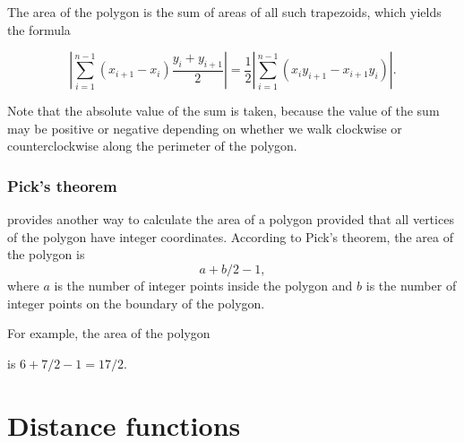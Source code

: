 The area of the polygon is the sum of areas of
all such trapezoids, which yields the formula

\[|\sum_{i=1}^{n-1} (x_{i+1}-x_{i}) \frac{y_i+y_{i+1}}{2}| =
\frac{1}{2} |\sum_{i=1}^{n-1} (x_i y_{i+1} - x_{i+1} y_i)|.\]

Note that the absolute value of the sum is taken,
because the value of the sum may be positive or negative
depending on whether we walk clockwise or counterclockwise
along the perimeter of the polygon.

\subsubsection{Pick's theorem}


 provides another way to calculate
the area of a polygon provided that all vertices 
of the polygon have integer coordinates.
According to Pick's theorem, the area of the polygon is
\[ a + b/2 -1,\]
where $a$ is the number of integer points inside the polygon
and $b$ is the number of integer points on the boundary of the polygon.

For example, the area of the polygon
\begin{center}
\end{center}
is $6+7/2-1=17/2$.

\section{Distance functions}

